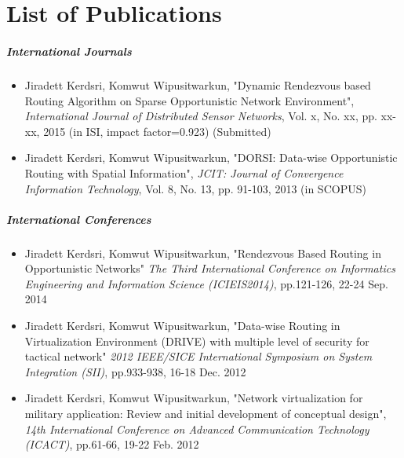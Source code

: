 \chapter{List of Publications}
\label{app1}


\paragraph{International Journals}

\begin{itemize}
\item Jiradett Kerdsri, Komwut Wipusitwarkun, "Dynamic Rendezvous based Routing Algorithm on Sparse Opportunistic Network Environment", \textit{International Journal of Distributed Sensor Networks}, Vol. x, No. xx, pp. xx-xx, 2015 (in ISI, impact factor=0.923)
(Submitted)
  \item Jiradett Kerdsri, Komwut Wipusitwarkun, "DORSI: Data-wise Opportunistic Routing with Spatial Information", \textit{JCIT: Journal of Convergence Information Technology}, Vol. 8, No. 13, pp. 91-103, 2013 (in SCOPUS)
\end{itemize}


\paragraph{International Conferences}

\begin{itemize}
\item Jiradett Kerdsri, Komwut Wipusitwarkun, "Rendezvous Based Routing in Opportunistic Networks" \textit{The Third International Conference on Informatics Engineering and Information Science (ICIEIS2014)}, pp.121-126, 22-24 Sep. 2014
\item Jiradett Kerdsri, Komwut Wipusitwarkun, "Data-wise Routing in Virtualization Environment (DRIVE) with multiple level of security for tactical network" \textit{2012 IEEE/SICE International Symposium on System Integration (SII)}, pp.933-938, 16-18 Dec. 2012
\item Jiradett Kerdsri, Komwut Wipusitwarkun, "Network virtualization for military application: Review and initial development of conceptual design", \textit{14th International Conference on Advanced Communication Technology (ICACT)}, pp.61-66, 19-22 Feb. 2012  
\end{itemize}